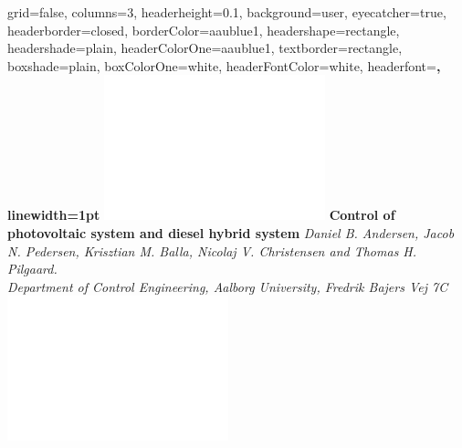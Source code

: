 \documentclass[a0paper,landscape]{baposter}
\begin{document}
\begin{poster}{
  grid=false,
  columns=3,
  headerheight=0.1\textheight,
  background=user,
  eyecatcher=true,
  headerborder=closed,
  borderColor=aaublue1,
  headershape=rectangle,
  headershade=plain,
  headerColorOne=aaublue1,
  textborder=rectangle,
  boxshade=plain,
  boxColorOne=white,
  headerFontColor=white,
  headerfont=\Large\sf\bf,
  linewidth=1pt
}
{
  \includegraphics[height=0.75\headerheight]{aau_logo_new_neg}
}
{\color{white}\bf
  Control of photovoltaic system and diesel hybrid system
}
{\vspace{0.3em}\color{white}\small
  \textit{\vspace{0.1em}Daniel B. Andersen, Jacob N. Pedersen, Krisztian M. Balla, Nicolaj V. Christensen and Thomas H. Pilgaard.\\
  Department of Control Engineering, Aalborg University, Fredrik Bajers Vej 7C}
}
{
  \includegraphics[height=0.75\headerheight]{aau_logo_new_neg}
}



\end{poster}
\end{document}
